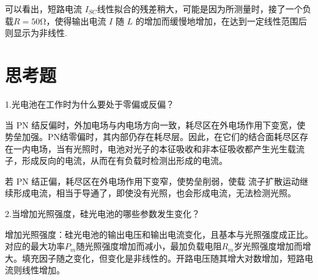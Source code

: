 \documentclass[11pt]{article}
\begin{document}
可以看出，短路电流 $ I_{SC}  $线性拟合的残差稍大，可能是因为所测量时，接了一个负载$ R=50 $Ω，使得输出电流 $ I $ 随 $ L $ 的增加而缓慢地增加，在达到一定线性范围后则显示为非线性.
\section{思考题}
\kaishu 1.光电池在工作时为什么要处于零偏或反偏？

\songti 当 PN 结反偏时，外加电场与内电场方向一致，耗尽区在外电场作用下变宽，使势垒加强。PN结零偏时，其内部仍存在耗尽层。因此，在它们的结合面耗尽区存在一内电场，当有光照时，电池对光子的本征吸收和非本征吸收都产生光生载流子，形成反向的电流，从而在有负载时检测出形成的电流。

若 PN 结正偏，耗尽区在外电场作用下变窄，使势垒削弱，使载
流子扩散运动继续形成电流，相当于导通了，即使没有光照，也会形成电流，无法检测光照。

\kaishu 2.当增加光照强度，硅光电池的哪些参数发生变化？

\songti 增加光照强度：硅光电池的输出电压和输出电流变化，且基本与光照强度成正比。对应的最大功率$ P_m $随光照强度增加而减小，最加负载电阻$ R_m $岁光照强度增加而增大。填充因子随之变化，但变化是非线性的。开路电压随其增大对数增加，短路电流则线性增加。
\end{document}
